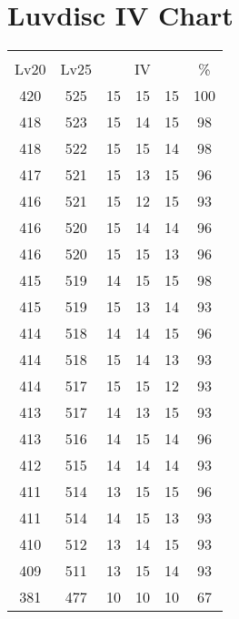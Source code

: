 \documentclass{article}%
\begin{document}
%
\normalsize%
\section{Luvdisc IV Chart}%
\label{sec:Luvdisc IV Chart}%
\renewcommand{\arraystretch}{1.5}%
\begin{tabular}{|c|c|c|c|c|c|}%
\hline%
\multicolumn{6}{|c|}{\textcolor{white}{ 
\linebreak{Luvdisc}
}%
\cellcolor{black}}\\%
\multicolumn{1}{|c}{Lv20}&\multicolumn{1}{c|}{Lv25}&\multicolumn{3}{c|}{IV}&\multicolumn{1}{|c|}{\%}\\%
\hline%
\rowcolor{color100}%
420&525&15&15&15&100\\%
\hline%
\rowcolor{color98}%
418&523&15&14&15&98\\%
\hline%
\rowcolor{color98}%
418&522&15&15&14&98\\%
\hline%
\rowcolor{color96}%
417&521&15&13&15&96\\%
\hline%
\rowcolor{color93}%
416&521&15&12&15&93\\%
\hline%
\rowcolor{color96}%
416&520&15&14&14&96\\%
\hline%
\rowcolor{color96}%
416&520&15&15&13&96\\%
\hline%
\rowcolor{color98}%
415&519&14&15&15&98\\%
\hline%
\rowcolor{color93}%
415&519&15&13&14&93\\%
\hline%
\rowcolor{color96}%
414&518&14&14&15&96\\%
\hline%
\rowcolor{color93}%
414&518&15&14&13&93\\%
\hline%
\rowcolor{color93}%
414&517&15&15&12&93\\%
\hline%
\rowcolor{color93}%
413&517&14&13&15&93\\%
\hline%
\rowcolor{color96}%
413&516&14&15&14&96\\%
\hline%
\rowcolor{color93}%
412&515&14&14&14&93\\%
\hline%
\rowcolor{color96}%
411&514&13&15&15&96\\%
\hline%
\rowcolor{color93}%
411&514&14&15&13&93\\%
\hline%
\rowcolor{color93}%
410&512&13&14&15&93\\%
\hline%
\rowcolor{color93}%
409&511&13&15&14&93\\%
\hline%
\rowcolor{color91}%
381&477&10&10&10&67\\%
\end{tabular}

%
\end{document}
